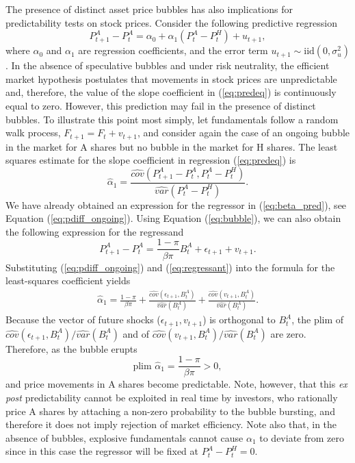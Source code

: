 \documentclass[11pt]{article}
\begin{document}
The presence of distinct asset price bubbles has also implications for predictability tests on stock prices. Consider the following predictive regression  
\begin{equation}\label{eq:predeq}
P_{t+1}^A-P_{t}^A=\alpha_0+\alpha_1 (P_{t}^A-P_{t}^H) + u_{t+1},
\end{equation} 
where $\alpha_0$ and $\alpha_1$ are regression coefficients, and the error term $u_{t+1}\sim \text{iid}(0,\sigma_u^2)$. In the absence of speculative bubbles and under risk neutrality, the efficient market hypothesis postulates that movements in stock prices are unpredictable and, therefore, the value of the slope coefficient in (\ref{eq:predeq}) is continuously equal to zero. However, this prediction may fail in the presence of distinct bubbles. To illustrate this point most simply, let fundamentals follow a random walk process, $F_{t+1}=F_t+v_{t+1}$, and consider again the case of an ongoing bubble in the market for A shares but no bubble in the market for H shares. The least squares estimate for the slope coefficient in regression (\ref{eq:predeq}) is
\begin{equation} \label{eq:beta_pred}
\widehat{\alpha}_1= \frac{\widehat{cov}(P_{t+1}^A-P_{t}^A,P_{t}^A-P_{t}^H)}{\widehat{var}(P_{t}^A-P_{t}^H)}.
\end{equation}
We have already obtained an expression for the regressor in (\ref{eq:beta_pred}), see Equation (\ref{eq:pdiff_ongoing}). Using Equation (\ref{eq:bubble}), we can also obtain the following expression for the regressand
\begin{equation}\label{eq:regressant}
P_{t+1}^A-P_{t}^A=\frac{1-\pi}{\beta\pi}B_t^A+\epsilon_{t+1}+v_{t+1}.
\end{equation}
Substituting (\ref{eq:pdiff_ongoing}) and (\ref{eq:regressant}) into the formula for the least-squares coefficient yields
\begin{eqnarray*}
\widehat{\alpha}_1 = \frac{1-\pi}{\beta\pi} + \frac{\widehat{cov}(\epsilon_{t+1},B_t^A)}{\widehat{var}(B_t^A)}+ \frac{\widehat{cov}(v_{t+1},B_t^A)}{\widehat{var}(B_t^A)}.
\end{eqnarray*}
Because the vector of future shocks ($\epsilon_{t+1},v_{t+1}$) is orthogonal to $B_t^A$, the plim of $\widehat{cov}(\epsilon_{t+1}, B_t^A)/\widehat{var}(B_t^A)$ and of $\widehat{cov}(v_{t+1}, B_t^A )/\widehat{var}(B_t^A)$ are zero. Therefore, as the bubble erupts
\begin{equation}
\text{plim } \widehat{\alpha}_1 = \frac{1-\pi}{\beta\pi} > 0,
\end{equation}
and price movements in A shares become predictable. Note, however, that this \textit{ex post} predictability cannot be exploited in real time by investors, who rationally price A shares by attaching a non-zero probability to the bubble bursting, and therefore it does not imply rejection of market efficiency. Note also that, in the absence of bubbles, explosive fundamentals cannot cause $\alpha_1$ to deviate from zero since in this case the regressor will be fixed at $P_t^A-P_t^H=0$.
\end{document}
